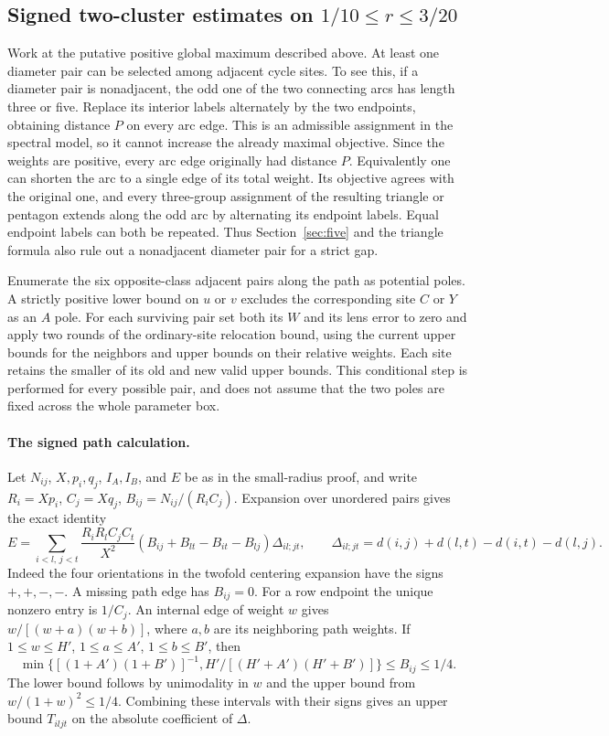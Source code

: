 \documentclass[11pt,a4paper]{article}
\theoremstyle{definition}
\begin{document}
\subsection{Signed two-cluster estimates on $1/10\le r\le3/20$}
Work at the putative positive global maximum described above. At least
one diameter pair can be selected among adjacent cycle sites. To see this,
if a diameter pair is nonadjacent, the odd one of the two connecting arcs
has length three or five. Replace its interior labels alternately by the
two endpoints, obtaining distance $P$ on every arc edge. This is an
admissible assignment in the spectral model, so it cannot increase the
already maximal objective. Since the weights are positive, every arc
edge originally had distance $P$. Equivalently one can shorten the arc
to a single edge of its total weight. Its objective agrees with the
original one, and every three-group assignment of the resulting triangle
or pentagon extends along the odd arc by alternating its endpoint
labels. Equal endpoint labels can both be repeated. Thus
Section~\ref{sec:five} and the triangle formula also rule out a
nonadjacent diameter pair for a strict gap.

Enumerate the six opposite-class adjacent pairs along the path as potential
poles. A strictly positive lower bound on $u$ or $v$ excludes the
corresponding site $C$ or $Y$ as an $A$ pole. For each surviving pair set
both its $W$ and its lens error to zero and apply two rounds of the
ordinary-site relocation bound, using the current upper bounds for the
neighbors and upper bounds on their relative weights. Each site retains
the smaller of its old and new valid upper bounds. This conditional
step is performed for every possible pair, and does not assume that the
two poles are fixed across the whole parameter box.

\paragraph{The signed path calculation.}
Let $N_{ij}$, $X,p_i,q_j$, $I_A,I_B$, and $E$ be as in the small-radius
proof, and write $R_i=Xp_i$, $C_j=Xq_j$, $B_{ij}=N_{ij}/(R_i C_j)$.
Expansion over unordered pairs gives the exact identity
\[
 E=\sum_{i<l,\,j<t}\frac{R_i R_l C_j C_t}{X^2}
 (B_{ij}+B_{lt}-B_{it}-B_{lj})\Delta_{il;jt},\qquad
 \Delta_{il;jt}=d(i,j)+d(l,t)-d(i,t)-d(l,j).
\]
Indeed the four orientations in the twofold centering expansion have
the signs $+,+,-,-$. A missing path edge has $B_{ij}=0$. For a row
endpoint the unique nonzero entry is $1/C_j$. An internal edge of
weight $w$ gives $w/[(w+a)(w+b)]$, where $a,b$ are its neighboring
path weights. If $1\le w\le H'$, $1\le a\le A'$, $1\le b\le B'$,
then
\[
 \min\{[(1+A')(1+B')]^{-1},H'/[(H'+A')(H'+B')]\}
 \le B_{ij}\le1/4 .
\]
The lower bound follows by unimodality in $w$ and the upper bound from
$w/(1+w)^2\le1/4$. Combining these intervals with their signs gives
an upper bound $T_{iljt}$ on the absolute coefficient of $\Delta$.
\end{document}
